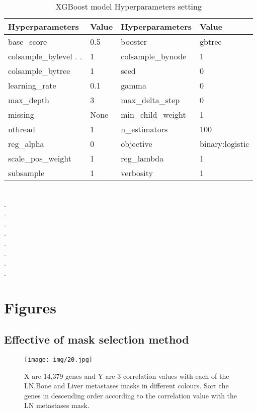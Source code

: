 \documentclass[12pt,a4paper]{report}
\begin{document}
\begin{table}[h!]
\begin{tabular}{|ll|ll|}
\hline
\textbf{Hyperparameters} & \textbf{Value} & \textbf{Hyperparameters} & \textbf{Value} \\ \hline
base\_score & 0.5 & booster & gbtree \\ \hline
colsample\_bylevel{\color[HTML]{FFFFFF} .}{\color[HTML]{FFFFFF} .} & 1 & colsample\_bynode & 1 \\ \hline
colsample\_bytree & 1 & seed & 0 \\ \hline
learning\_rate & 0.1 & gamma & 0 \\ \hline
max\_depth & 3 & max\_delta\_step & 0 \\ \hline
missing & None & min\_child\_weight & 1 \\ \hline
nthread & 1 & n\_estimators & 100 \\ \hline
reg\_alpha & 0 & objective & binary:logistic \\ \hline
scale\_pos\_weight & 1 & reg\_lambda & 1 \\ \hline
subsample & 1 & verbosity & 1 \\ \hline
\end{tabular}
\caption{XGBoost model Hyperparameters setting}
\label{tab:my-table}
\end{table}
\\
{\color[HTML]{FFFFFF} .}
\\
{\color[HTML]{FFFFFF} .}
\\
{\color[HTML]{FFFFFF} .}
\\
{\color[HTML]{FFFFFF} .}
\\
{\color[HTML]{FFFFFF} .}
\\
{\color[HTML]{FFFFFF} .}
\\
{\color[HTML]{FFFFFF} .}
\\
{\color[HTML]{FFFFFF} .}


\chapter{Figures}
\section{Effective of mask selection method}

\begin{figure}[h!]
\centering
\texttt{[image: img/20.jpg]}
\caption{X are 14,379 genes and Y are 3 correlation values with each of the LN,Bone and Liver metastases masks in different colours.  Sort the genes in descending order according to the correlation value with the LN metastases mask.}
\end{figure}\\
\end{document}
